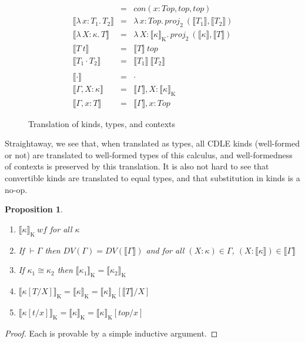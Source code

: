 \documentclass{article}
\newcommand{\abs}[4]{{#1}\, #2\! : \! #3.\, #4}
\newcommand{\interp}[1]{\llbracket #1 \rrbracket}
\newtheorem{proposition}[theorem]{Proposition}
\begin{document}
\begin{figure}
\[\begin{array}{lcl}
      & =
      & \mathit{con}(x\!:\!\mathit{Top},\mathit{top},\mathit{top})
      \\ \interp{\abs{\lambda}{x}{T_1}{T_2}}
      & =
      & \abs{\lambda}{x}{\mathit{Top}}{\mathit{proj}_2\ (\interp{T_1},\interp{T_2})}
      \\ \interp{\abs{\lambda}{X}{\kappa}{T}}
      & =
      & \abs{\lambda}{X}{\interp{\kappa}_{\text{K}}}{\mathit{proj_2}\ (\interp{\kappa},\interp{T})}
      \\ \interp{T\ t}
      & =
      & \interp{T}\ \mathit{top}
      \\ \interp{T_1 \cdot T_2}
      & =
      & \interp{T_1}\ \interp{T_2}
      \\ \\
      \interp{\cdot}
      & =
      & \cdot
      \\ \interp{\Gamma,X\!:\!\kappa}
      & =
      & \interp{\Gamma},X\!:\!\interp{\kappa}_{\text{K}}
      \\ \interp{\Gamma,x\!:\!T}
      & =
      & \interp{\Gamma},x\!:\!\mathit{Top}
    \end{array}
  \]
  \caption{Translation of kinds, types, and contexts}
  \label{fig:bespoke-trans}
\end{figure}

Straightaway, we see that, when translated as types, all CDLE kinds (well-formed
or not) are translated to well-formed types of this calculus, and
well-formedness of contexts is preserved by this translation.
It is also not hard to see that convertible kinds are translated to equal types,
and that substitution in kinds is a no-op.
\begin{proposition}
  \label{thm:stlc-kinds}
  \ 
  \begin{enumerate}
  \item \(\interp{\kappa}_{\text{K}}\ \mathit{wf}\) for all \(\kappa\)
    
  \item If \(\vdash \Gamma\) then \(\mathit{DV}(\Gamma) =
    \mathit{DV}(\interp{\Gamma})\) and for all \((X\!:\!\kappa) \in \Gamma\),
    \((X\!:\!\interp{\kappa}) \in \interp{\Gamma}\)
  \item If \(\kappa_1 \cong \kappa_2\) then \(\interp{\kappa_1}_{\text{K}} = \interp{\kappa_2}_{\text{K}}\)
  \item \(\interp{\kappa[T/X]}_{\text{K}} = \interp{\kappa}_{\text{K}} = \interp{\kappa}_{\text{K}}
    [\interp{T}/X]\)
  \item \(\interp{\kappa[t/x]}_{\text{K}} = \interp{\kappa}_{\text{K}} = \interp{\kappa}_{\text{K}}[\mathit{top}/x]\)
  \end{enumerate}
\end{proposition}
\begin{proof}
  Each is provable by a simple inductive argument.
\end{proof}
\end{document}
